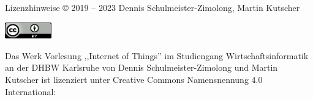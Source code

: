 {
    \tiny
    \begin{frame}{Lizenzhinweise}
            © 2019 -- 2023 Dennis Schulmeister-Zimolong, Martin Kutscher
            \medskip

            \medskip

            \includegraphics[width=2cm]{include/cc-by.png}
            \medskip

            Das Werk Vorlesung ,,Internet of Things'' im Studiengang Wirtschaftsinformatik
            an der DHBW Karlsruhe von Dennis Schulmeister-Zimolong und Martin Kutscher ist
            lizenziert unter Creative Commons Namensnennung 4.0 International:
            \medskip

    \end{frame}
}

